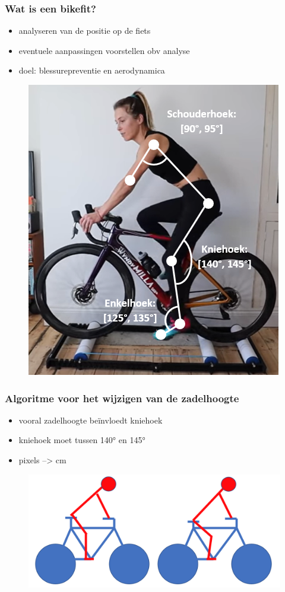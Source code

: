 \documentclass
   [kulak] %
   {kulakbeamer}
\begin{document}
\begin{frame}
	\frametitle{Wat is een bikefit?}
	\begin{itemize}
		\item analyseren van de positie op de fiets
		\item eventuele aanpassingen voorstellen obv analyse
		\item doel: blessurepreventie en aerodynamica
	\end{itemize}
\begin{figure}
	\includegraphics[width= .4\textwidth]{bikefit_hoeken_foto}
\end{figure}
\end{frame}

\begin{frame}
	\frametitle{Algoritme voor het wijzigen van de zadelhoogte}
	\begin{itemize}
		\item vooral zadelhoogte beïnvloedt kniehoek
		\item kniehoek moet tussen 140° en 145°
		\item pixels --> \si{cm}
	\end{itemize}
	\begin{figure}
		\includegraphics[width= \textwidth]{zadel.png}
	\end{figure}
\end{frame}
\end{document}
